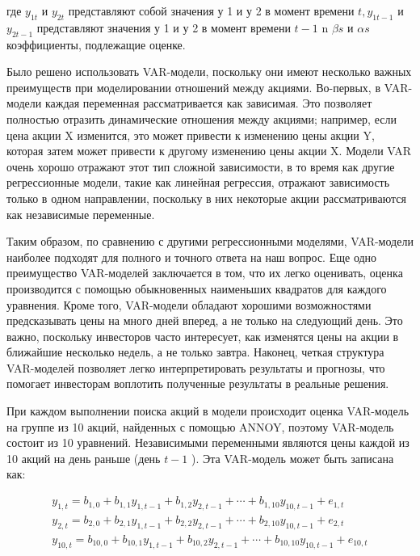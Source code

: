 \begin{multicols}{2}
где \(y_{1t}\) и \(y_{2t}\) представляют собой значения у 1 и у 2 в
момент времени \(t,y_{1t - 1}\) и \(y_{2t - 1}\) представляют значения у
1 и у 2 в момент времени \(t - 1\) n \(\beta s\) и \(\alpha s\)
коэффициенты, подлежащие оценке.

Было решено использовать VAR-модели, поскольку они имеют несколько
важных преимуществ при моделировании отношений между акциями. Во-первых,
в VAR-модели каждая переменная рассматривается как зависимая. Это
позволяет полностью отразить динамические отношения между акциями;
например, если цена акции X изменится, это может привести к изменению
цены акции Y, которая затем может привести к другому изменению цены
акции X. Модели VAR очень хорошо отражают этот тип сложной зависимости,
в то время как другие регрессионные модели, такие как линейная
регрессия, отражают зависимость только в одном направлении, поскольку в
них некоторые акции рассматриваются как независимые переменные.

Таким образом, по сравнению с другими регрессионными моделями,
VAR-модели наиболее подходят для полного и точного ответа на наш вопрос.
Еще одно преимущество VAR-моделей заключается в том, что их легко
оценивать, оценка производится с помощью обыкновенных наименьших
квадратов для каждого уравнения. Кроме того, VAR-модели обладают
хорошими возможностями предсказывать цены на много дней вперед, а не
только на следующий день. Это важно, поскольку инвесторов часто
интересует, как изменятся цены на акции в ближайшие несколько недель, а
не только завтра. Наконец, четкая структура VAR-моделей позволяет легко
интерпретировать результаты и прогнозы, что помогает инвесторам
воплотить полученные результаты в реальные решения.

При каждом выполнении поиска акций в модели происходит оценка VAR-модель
на группе из 10 акций, найденных с помощью ANNOY, поэтому VAR-модель
состоит из 10 уравнений. Независимыми переменными являются цены каждой
из 10 акций на день раньше (день \(t - 1\) ). Эта VAR-модель может быть
записана как:
\end{multicols}

\begin{equation}
\begin{matrix}
y_{1,t} = b_{1,0} + b_{1,1}y_{1,t - 1} + b_{1,2}y_{2,t - 1} + \cdots + b_{1,10}y_{10,t - 1} + e_{1,t} \\
y_{2,t} = b_{2,0} + b_{2,1}y_{1,t - 1} + b_{2,2}y_{2,t - 1} + \cdots + b_{2,10}y_{10,t - 1} + e_{2,t} \\
y_{10,t} = b_{10,0} + b_{10,1}y_{1,t - 1} + b_{10,2}y_{2,t - 1} + \cdots + b_{10,10}y_{10,t - 1} + e_{10,t}
\end{matrix}
\end{equation}


